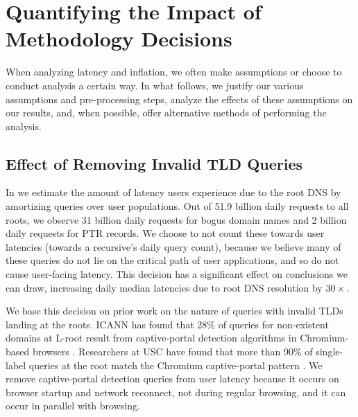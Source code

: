\documentclass[sigconf,letterpaper,nonacm,10pt,anonymous]{acmart}
\begin{document}
{\small\balance}
\appendix
\newpage

\section{Quantifying the Impact of Methodology
Decisions}\label{quantifying-the-impact-of-methodology-decisions}

When analyzing latency and inflation, we often make assumptions or
choose to conduct analysis a certain way. In what follows, we justify
our various assumptions and pre-processing steps, analyze the effects of
these assumptions on our results, and, when possible, offer alternative
methods of performing the analysis.

\subsection{Effect of Removing Invalid TLD
Queries}\label{effect-of-removing-invalid-tld-queries-1}

\label{ap:invalid_queries}

In  we estimate the amount of latency users
experience due to the root DNS by amortizing queries over user
populations. Out of 51.9 billion daily requests to all roots, we observe
31 billion daily requests for bogus domain names and 2 billion daily
requests for PTR records. We choose to not count these towards user
latencies (\ie towards a recursive's daily query count), because we
believe many of these queries do not lie on the critical path of user
applications, and so do not cause user-facing latency. This decision has
a significant effect on conclusions we can draw, increasing daily median
latencies due to root DNS resolution by \(30\times\).

We base this decision on prior work on the nature of queries with
invalid TLDs landing at the roots. ICANN has found that 28\% of queries
for non-existent domains at L-root result from captive-portal detection
algorithms in Chromium-based browsers \cite{akplogan2020covid}.
Researchers at USC have found that more than 90\% of single-label
queries at the root match the Chromium captive-portal pattern
\cite{broot_invalid_queries}. We remove captive-portal detection queries
from user latency because it occurs on browser startup and network
reconnect, not during regular browsing, and it can occur in parallel
with browsing.
\end{document}
